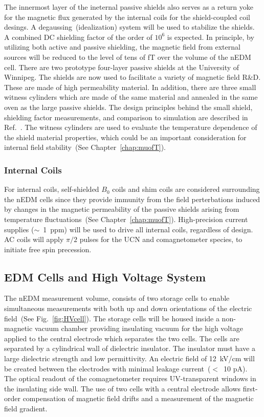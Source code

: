 The innermost layer of the ineternal passive shields also serves as a
return yoke for the magnetic flux generated by the internal coils for
the shield-coupled coil desings. A degaussing~(idealization) system
will be used to stabilize the shields. A combined DC shielding factor
of the order of $10^6$ is expected. In principle, by utilizing both
active and passive shielding, the magnetic field from external sources
will be reduced to the level of tens of fT over the volume of the nEDM
cell.  There are two prototype four-layer passive shields at the
University of Winnipeg. The shields are now used to facilitate a
variety of magnetic field R\&D. These are made of high permeability
material. In addition, there are three small witness cylinders which
are made of the same material and annealed in the same oven as the
large passive shields. The design principles behind the small shield,
shielding factor measurements, and comparison to simulation are
described in Ref.~\cite{martin2015large}.  The witness cylinders are
used to evaluate the temperature dependence of the shield material
properties, which could be an important consideration for internal
field stability~(See Chapter~\ref{chap:muofT}).


\subsubsection{Internal Coils}
For internal coils, self-shielded $B_0$ coils and shim coils are
considered surrounding the nEDM cells since they provide immunity from
the field perterbations induced by changes in the magnetic
permeability of the passive shields arising from temperature
fluctuations~(See Chapter~\ref{chap:muofT}).  High-precision current
supplies ($\sim$~1~ppm) will be used to drive all internal coils,
regardless of design. AC coils will apply $\pi/2$ pulses for the UCN and
comagnetometer species, to initiate free spin precession.



\subsection{ EDM Cells and High Voltage System}
The nEDM measurement volume, consists of two storage cells to enable
simultaneous measurements with both up and down orientations of the
electric field~(See Fig.~\ref{fig:HVcell}). The storage cells will be
housed inside a non-magnetic vacuum chamber providing insulating
vacuum for the high voltage applied to the central electrode which
separates the two cells.  The cells are separated by a cylindrical
wall of dielectric insulator.  The insulator must have a large
dielectric strength and low permittivity.  An electric field of
12~kV/cm will be created between the electrodes with minimal leakage
current~($<$~10 pA).  The optical readout of the comagnetometer
requires UV-transparent windows in the insulating side wall. The use
of two cells with a central electrode allows first-order compensation
of magnetic field drifts and a measurement of the magnetic field
gradient.

